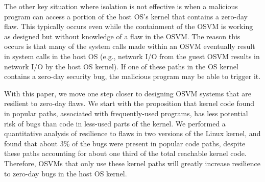 The other key situation where isolation is not effective is when a malicious 
program  can access a portion of the host OS's kernel that contains a 
zero-day flaw.  This typically occurs even while the containment of the OSVM is 
working as designed but without knowledge of a flaw in the OSVM.  The reason
this occurs is that many of the system calls made within an OSVM eventually 
result in system calls in the host OS (e.g., network I/O from the guest
OSVM results in network I/O by the host OS kernel).  If one of these paths in
the OS kernel contains a zero-day security bug, the malicious program
may be able to trigger it.



With this paper, we move one step closer to designing OSVM systems that are
resilient to zero-day flaws.   We start
 with the proposition that kernel code found in popular paths, associated with frequently-used programs,
has less potential risk of bugs than code in less-used parts of the kernel.
We performed a quantitative analysis of resilience
  to flaws in two versions of the Linux kernel, and
found that about 3\% of the bugs were present in popular code paths,
despite these paths accounting for about one third of the total reachable 
kernel code.  
Therefore, OSVMs that only use these kernel paths will 
greatly increase resilience to zero-day bugs in the host OS kernel.

